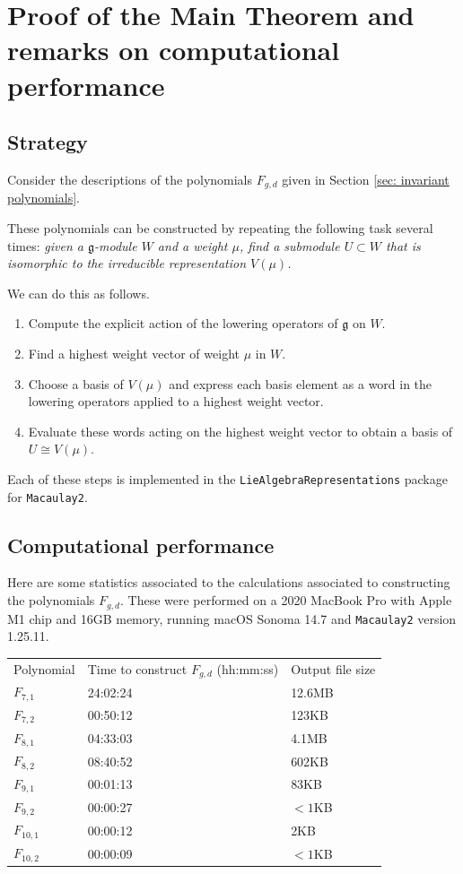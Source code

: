 \documentclass{amsart}[12pt]
\theoremstyle{definition}
\numberwithin{equation}{section}
\begin{document}
\section{Proof of the Main Theorem and remarks on computational performance} \label{sec: proof}


\subsection{Strategy} Consider the descriptions of the polynomials
$F_{g,d}$ given in Section \ref{sec: invariant polynomials}.

These polynomials can be constructed by repeating the following task
several times: \textit{given a $\mathfrak{g}$-module $W$ and a weight $\mu$,
find a submodule $U\subset W$
that is isomorphic to the irreducible representation $V(\mu)$.}  

We can do this as follows.
\begin{enumerate}
\item Compute the explicit action of the lowering operators of
  $\mathfrak{g}$ on $W$.
\item Find a highest weight vector of weight $\mu$ in $W$.
\item Choose a basis of $V(\mu)$ and express each basis element
  as a word in the lowering operators applied to a highest weight vector.
\item Evaluate these words acting on the highest weight vector to obtain
  a basis of $U \cong V(\mu)$.
\end{enumerate}


Each of these steps is implemented in the \texttt{LieAlgebraRepresentations} package
for \texttt{Macaulay2}.


\subsection{Computational performance}
Here are some statistics associated to the calculations associated to
constructing the polynomials $F_{g,d}$. These were performed on a 2020
MacBook Pro with Apple M1 chip and 16GB memory, running macOS Sonoma
14.7 and \texttt{Macaulay2} version 1.25.11. 
\begin{center}
\begin{tabular}{lll}
  Polynomial & Time to construct $F_{g,d}$ (hh:mm:ss) & Output file size \\
  $F_{7,1}$ & 24:02:24 & 12.6MB \\
  $F_{7,2}$ & 00:50:12 & 123KB \\
  $F_{8,1}$ & 04:33:03 & 4.1MB \\
  $F_{8,2}$ & 08:40:52 & 602KB \\
  $F_{9,1}$ & 00:01:13 & 83KB \\
  $F_{9,2}$ & 00:00:27 & $<1$KB \\
  $F_{10,1}$ & 00:00:12& 2KB \\
  $F_{10,2}$ & 00:00:09 & $<1$KB \\
\end{tabular}
\end{center}
\end{document}
